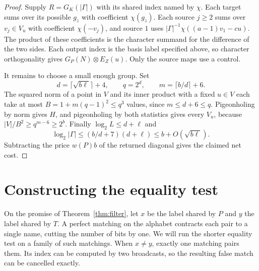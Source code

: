 \begin{proof}
Supply \(R=G_K(|\Gamma|)\) with its shared index named by \(\chi\).
Each target sums over its possible \(g_z\) with coefficient \(\chi(g_z)\).
Each source \(j\ge2\) sums over \(v_j\in V_u\) with coefficient
\(\chi(-v_j)\), and source \(1\) uses
\(|\Gamma|^{-1}\chi((a-1)v_1-cu)\).
The product of these coefficients is the character summand for the
difference of the two sides. Each output index is the basis label
specified above, so character orthogonality gives
\(G_P(N)\otimes E_Z(u)\). Only the source maps use a control.

It remains to choose a small enough group. Set
\[
 d=\lceil\sqrt{b\ell}\rceil+4,\qquad q=2^d,\qquad
 m=\lceil b/d\rceil+6 .
\]
The squared norm of a point in \(V\) and its inner product with a
fixed \(u\in V\) each take at most \(B=1+m(q-1)^2\le q^3\) values,
since \(m\le d+6\le q\). Pigeonholing by norm gives \(H\), and
pigeonholing by both statistics gives every \(V_u\), because
\(|V|/B^2\ge q^{m-6}\ge 2^b\). Finally \(\log_2 L\le d+\ell\) and
\[
 \log_2|\Gamma|\le (b/d+7)(d+\ell)
                  \le b+O(\sqrt{b\ell}).
\]
Subtracting the price \(w(P)b\) of the returned diagonal gives the
claimed net cost.
\end{proof}

\section{Constructing the equality test}\label{sec:filter}

On the promise of Theorem~\ref{thm:filter}, let \(x\) be the label
shared by \(P\) and \(y\) the label shared by \(T\). A perfect matching
on the alphabet contracts each pair to a single name, cutting the
number of bits by one. We will run the shorter equality test on a
family of such matchings. When \(x\ne y\), exactly one matching
pairs them. Its index can be computed by two broadcasts, so the
resulting false match can be cancelled exactly.

